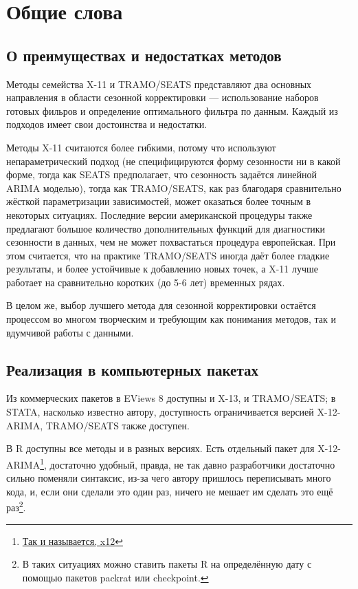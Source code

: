 \documentclass[final,pdftex]{../../template/epsilonj}\usepackage[]{graphicx}\usepackage[]{color}
\begin{document}
\section{Общие слова}
\subsection{О преимуществах и недостатках методов}

Методы семейства X-11 и TRAMO/SEATS представляют два основных направления в области сезонной корректировки --- использование наборов готовых фильров и определение оптимального фильтра по данным. Каждый из подходов имеет свои достоинства и недостатки. 

Методы X-11 считаются более гибкими, потому что используют непараметрический подход (не специфицируются форму сезонности ни в какой форме, тогда как SEATS предполагает, что сезонность задаётся линейной ARIMA моделью), тогда как TRAMO/SEATS, как раз благодаря сравнительно жёсткой параметризации зависимостей, может оказаться более точным в некоторых ситуациях. Последние версии американской процедуры также предлагают большое количество дополнительных функций для диагностики сезонности в данных, чем не может похвастаться процедура европейская. При этом считается, что на практике TRAMO/SEATS иногда даёт более гладкие результаты, и более устойчивые к добавлению новых точек, а X-11 лучше работает на сравнительно коротких (до 5-6 лет) временных рядах. 

В целом же, выбор лучшего метода для сезонной корректировки остаётся процессом во многом творческим и требующим как понимания методов, так и вдумчивой работы с данными. 

\subsection{Реализация в компьютерных пакетах}

Из коммерческих пакетов в EViews 8 доступны и X-13, и TRAMO/SEATS; в STATA, насколько известно автору, доступность ограничивается версией X-12-ARIMA, TRAMO/SEATS также доступен. 

В R доступны все методы и в разных версиях. Есть отдельный пакет для X-12-ARIMA\footnote{\href{http://cran.r-project.org/web/packages/x12/x12.pdf}{Так и называется, x12}}, достаточно удобный, правда, не так давно разработчики достаточно сильно поменяли синтаксис, из-за чего автору пришлось переписывать много кода, и, если они сделали это один раз, ничего не мешает им сделать это ещё раз\footnote{В таких ситуациях можно ставить пакеты R на определённую дату с помощью пакетов packrat или checkpoint.}. 
\end{document}
